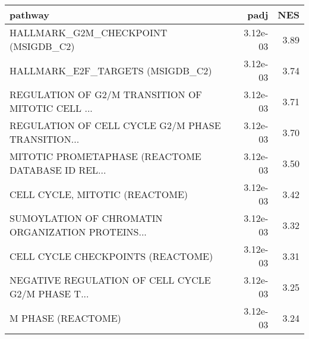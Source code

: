 \begin{tabular}{lrr}
\toprule
                                           pathway &      padj &   NES \\
\midrule
               HALLMARK\_G2M\_CHECKPOINT (MSIGDB\_C2) &  3.12e-03 &  3.89 \\
                  HALLMARK\_E2F\_TARGETS (MSIGDB\_C2) &  3.12e-03 &  3.74 \\
 REGULATION OF G2/M TRANSITION OF MITOTIC CELL ... &  3.12e-03 &  3.71 \\
 REGULATION OF CELL CYCLE G2/M PHASE TRANSITION... &  3.12e-03 &  3.70 \\
 MITOTIC PROMETAPHASE (REACTOME DATABASE ID REL... &  3.12e-03 &  3.50 \\
                    CELL CYCLE, MITOTIC (REACTOME) &  3.12e-03 &  3.42 \\
 SUMOYLATION OF CHROMATIN ORGANIZATION PROTEINS... &  3.12e-03 &  3.32 \\
                 CELL CYCLE CHECKPOINTS (REACTOME) &  3.12e-03 &  3.31 \\
 NEGATIVE REGULATION OF CELL CYCLE G2/M PHASE T... &  3.12e-03 &  3.25 \\
                                M PHASE (REACTOME) &  3.12e-03 &  3.24 \\
\bottomrule
\end{tabular}
